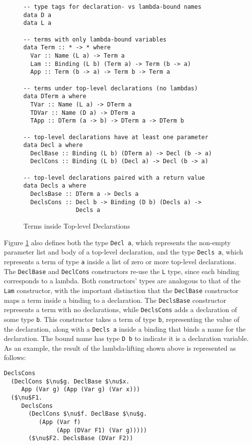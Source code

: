 \documentclass[natbib]{sigplanconf}
\begin{document}
\begin{figure}
\vspace{-5pt}
\begin{lstlisting}[basicstyle=\ttfamily\scriptsize]
-- type tags for declaration- vs lambda-bound names
data D a
data L a

-- terms with only lambda-bound variables
data Term :: * -> * where
  Var :: Name (L a) -> Term a
  Lam :: Binding (L b) (Term a) -> Term (b -> a)
  App :: Term (b -> a) -> Term b -> Term a

-- terms under top-level declarations (no lambdas)
data DTerm a where
  TVar :: Name (L a) -> DTerm a
  TDVar :: Name (D a) -> DTerm a
  TApp :: DTerm (a -> b) -> DTerm a -> DTerm b

-- top-level declarations have at least one parameter
data Decl a where
  DeclBase :: Binding (L b) (DTerm a) -> Decl (b -> a)
  DeclCons :: Binding (L b) (Decl a) -> Decl (b -> a)

-- top-level declarations paired with a return value
data Decls a where
  DeclsBase :: DTerm a -> Decls a
  DeclsCons :: Decl b -> Binding (D b) (Decls a) ->
               Decls a
\end{lstlisting}
\caption{Terms inside Top-level Declarations}
\label{fig:decls}
\end{figure}



Figure \ref{fig:decls} also defines both the type \lstinline{Decl a},
which represents the non-empty parameter list and body of a top-level
declaration, and the type \lstinline{Decls a}, which represents a term
of type \lstinline{a} inside a list of zero or more top-level
declarations. The \lstinline{DeclBase} and \lstinline{DeclCons}
constructors re-use the \lstinline{L} type, since each binding
corresponds to a lambda. Both constructors' types are analogous to
that of the \lstinline{Lam} constructor, with the important
distinction that the \lstinline{DeclBase} constructor maps a term
inside a binding to a declaration. The \lstinline{DeclsBase}
constructor represents a term with no declarations, while
\lstinline{DeclsCons} adds a declaration of some type
\lstinline{b}. This constructor takes a term of type \lstinline{b},
representing the value of the declaration, along with a
\lstinline{Decls a} inside a binding that binds a name for the
declaration. The bound name has type \lstinline{D b} to indicate it is
a declaration variable. As an example, the result of the
lambda-lifting shown above is represented as follows:
\begin{lstlisting}[mathescape]
DeclsCons
  (DeclCons $\nu$g. DeclBase $\nu$x.
     App (Var g) (App (Var g) (Var x)))
  ($\nu$F1.
     DeclsCons
       (DeclCons $\nu$f. DeclBase $\nu$g.
          (App (Var f)
               (App (DVar F1) (Var g)))))
       ($\nu$F2. DeclsBase (DVar F2))
\end{lstlisting}
\end{document}
